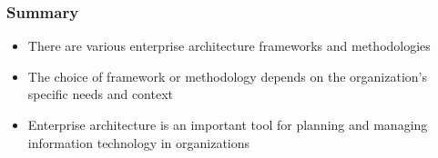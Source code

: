 \documentclass[aspectratio=169, table]{beamer}
\begin{document}
    \begin{frame}
        \frametitle{Summary}
        \begin{itemize}
            \item There are various enterprise architecture frameworks and methodologies
            \item The choice of framework or methodology depends on the organization's specific needs and context
            \item Enterprise architecture is an important tool for planning and managing information technology in organizations
        \end{itemize}
    \end{frame}
\end{document}
